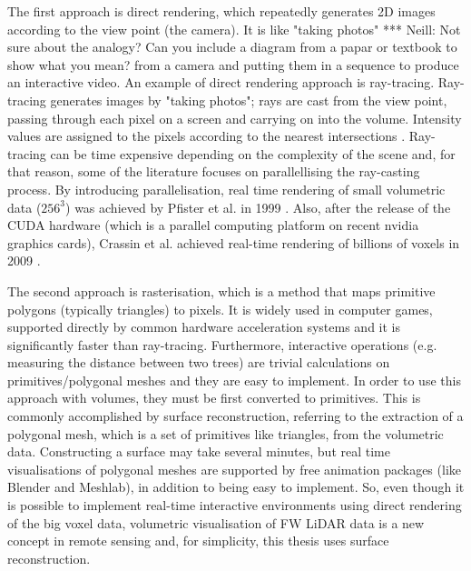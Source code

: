 \documentclass{subfiles}
\begin{document}
\par The first approach is direct rendering, which repeatedly generates 2D images according to the view point (the camera). It is like "taking photos" {\color{red} *** Neill: Not sure about the analogy? Can you include a diagram from a papar or textbook to show what you mean?} from a camera and putting them in a sequence to produce an interactive video. An example of direct rendering approach is ray-tracing. Ray-tracing generates images by "taking photos"; rays are cast from the view point, passing through each pixel on a screen and carrying on into the volume.  Intensity values are assigned to the pixels according to the nearest intersections \cite{Hanrahan1983}. Ray-tracing can be time expensive depending on the complexity of the scene and, for that reason, some of the literature focuses on parallellising the ray-casting process. By introducing parallelisation, real time rendering of small volumetric data ($256^3$) was achieved by Pfister et al. in 1999 \cite{Pfister1999}. Also, after the release of the CUDA hardware \cite{Nickolls2008} (which is a parallel computing platform on recent nvidia graphics cards), Crassin et al. achieved real-time rendering of billions of voxels in 2009 \cite{Crassin2009}. 
	
\par The second approach is rasterisation, which is a method that maps primitive polygons (typically triangles) to pixels.  It is widely used in computer games, supported directly by common hardware acceleration systems and it is significantly faster than ray-tracing. Furthermore, interactive operations (e.g. measuring the distance between two trees) are trivial calculations on primitives/polygonal meshes and they are easy to implement.  In order to use this approach with volumes, they must be first converted to primitives.  This is commonly accomplished by surface reconstruction, referring to the extraction of a polygonal mesh, which is a set of primitives like triangles, from the volumetric data. Constructing a surface may take several minutes, but real time visualisations of polygonal meshes are supported by free animation packages (like Blender and Meshlab), in addition to being easy to implement.  So, even though it is possible to implement real-time interactive environments using direct rendering of the big voxel data, volumetric visualisation of FW LiDAR data is a new concept in remote sensing and, for simplicity, this thesis uses surface reconstruction.
\end{document}
